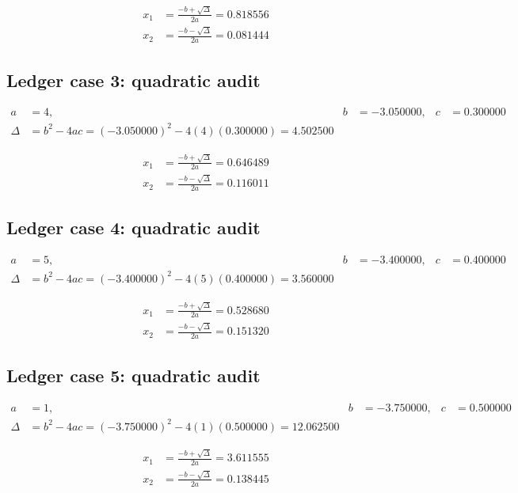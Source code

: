 \documentclass[11pt,a4paper]{article}
\begin{document}
\begin{align}
x_1 &= \frac{-b+\sqrt{\Delta}}{2a} = 0.818556 \\
x_2 &= \frac{-b-\sqrt{\Delta}}{2a} = 0.081444
\end{align}

\subsection{Ledger case 3: quadratic audit}
\begin{align}
a &= 4, & b &= -3.050000, & c &= 0.300000 \\
\Delta &= b^2-4ac = (-3.050000)^2 - 4(4)(0.300000) = 4.502500
\end{align}

\begin{align}
x_1 &= \frac{-b+\sqrt{\Delta}}{2a} = 0.646489 \\
x_2 &= \frac{-b-\sqrt{\Delta}}{2a} = 0.116011
\end{align}

\newpage

\subsection{Ledger case 4: quadratic audit}
\begin{align}
a &= 5, & b &= -3.400000, & c &= 0.400000 \\
\Delta &= b^2-4ac = (-3.400000)^2 - 4(5)(0.400000) = 3.560000
\end{align}

\begin{align}
x_1 &= \frac{-b+\sqrt{\Delta}}{2a} = 0.528680 \\
x_2 &= \frac{-b-\sqrt{\Delta}}{2a} = 0.151320
\end{align}

\subsection{Ledger case 5: quadratic audit}
\begin{align}
a &= 1, & b &= -3.750000, & c &= 0.500000 \\
\Delta &= b^2-4ac = (-3.750000)^2 - 4(1)(0.500000) = 12.062500
\end{align}

\begin{align}
x_1 &= \frac{-b+\sqrt{\Delta}}{2a} = 3.611555 \\
x_2 &= \frac{-b-\sqrt{\Delta}}{2a} = 0.138445
\end{align}
\end{document}
